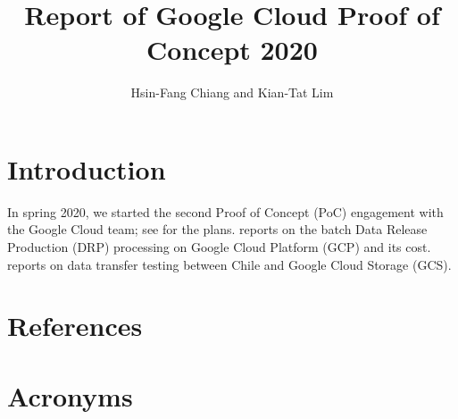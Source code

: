 \documentclass[DM,authoryear,toc,lsstdraft]{lsstdoc}
\title{Report of Google Cloud Proof of Concept 2020}
\author{%
Hsin-Fang Chiang and Kian-Tat Lim
}
\date{\vcsDate}
\begin{document}
\mkshorttitle

\section{Introduction}

In spring 2020, we started the second Proof of Concept (PoC) engagement with the Google Cloud team; see  for the plans.
 reports on the batch Data Release Production (DRP) processing on Google Cloud Platform (GCP) and its cost.
 reports on data transfer testing between Chile and Google Cloud Storage (GCS).





\appendix
\section{References} \label{sec:bib}
\renewcommand{\refname}{} %


\section{Acronyms} \label{sec:acronyms}

\end{document}

